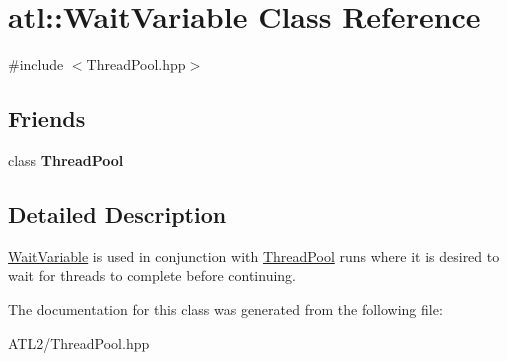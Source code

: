 \hypertarget{classatl_1_1_wait_variable}{\section{atl\+:\+:Wait\+Variable Class Reference}
\label{classatl_1_1_wait_variable}
}


{\ttfamily \#include $<$Thread\+Pool.\+hpp$>$}

\subsection*{Friends}
\begin{DoxyCompactItemize}
\item 
\hypertarget{classatl_1_1_wait_variable_ac4810fd904928605bdb3f8606ffe5ec4}{class {\bfseries Thread\+Pool}}\label{classatl_1_1_wait_variable_ac4810fd904928605bdb3f8606ffe5ec4}

\end{DoxyCompactItemize}


\subsection{Detailed Description}
\hyperlink{classatl_1_1_wait_variable}{Wait\+Variable} is used in conjunction with \hyperlink{classatl_1_1_thread_pool}{Thread\+Pool} runs where it is desired to wait for threads to complete before continuing. 

The documentation for this class was generated from the following file\+:\begin{DoxyCompactItemize}
\item 
A\+T\+L2/Thread\+Pool.\+hpp\end{DoxyCompactItemize}
